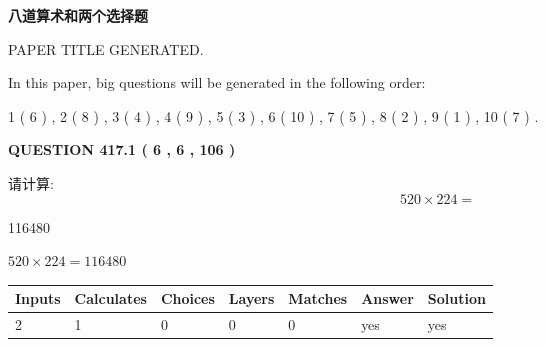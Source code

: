\documentclass{ctexart}
\begin{document}
   
\vspace{0.2in}
   
   
   
   
   
   
   
   
 \vspace{0.2in}
{\LARGE {\textbf{ 八道算术和两个选择题}}}
   
   
 PAPER TITLE GENERATED.
   
   
   
\vspace{0.2in}
   
In this paper, big questions will be generated in the following order: 
   
   
   1 ( 6 )
 ,
   2 ( 8 )
 ,
   3 ( 4 )
 ,
   4 ( 9 )
 ,
   5 ( 3 )
 ,
   6 ( 10 )
 ,
   7 ( 5 )
 ,
   8 ( 2 )
 ,
   9 ( 1 )
 ,
   10 ( 7 )
 .
  
\vspace{0.2in}
  
{\textbf{\Large{QUESTION
417.1 
 ( 6 , 6 , 106 )
}}}
  
  
 
请计算:
\begin{equation}
520  \times    %
224 = \nonumber
\end{equation}
 
 
 
\noindent{}
 
 

116480
 
 
\noindent{}
 
 

 
 
 
\noindent{}
 
 

$ %
520 \times  %
224=   %
116480$
 
 
\noindent{}
 
 

 
   
   
   
   
\noindent\begin{tabular}{|l|l|l|l|l|l|l|}
 \hline
Inputs & Calculates & Choices & Layers & Matches & Answer & Solution \\ \hline
 2  & 
 1  & 
 0
  & 
 0  & 
 0  & 
  yes & 
  yes 
  \\ \hline
 \end{tabular}
   
\end{document}
